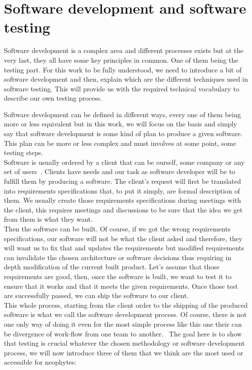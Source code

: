 \documentclass[12pt]{article}
\theoremstyle{definition}
\theoremstyle{definition}
\theoremstyle{remark}
\begin{document}
\clearpage
\part{Software development and software testing}

Software development is a complex area and different processes exists but at the very last, they all have some key principles in common. One of them being the testing part. For this work to be fully understood, we need to introduce a bit of software development and then, explain which are the different techniques used in software testing. This will provide us with the required technical vocabulary to describe our own testing process.

Software development can be defined in different ways, every one of them being more or less equivalent but in this work, we will focus on the basis and simply say that software development is some kind of plan to produce a given software. This plan can be more or less complex and must involves at some point, some testing steps.\\

Software is usually ordered by a client that can be ourself, some company or any set of users~\cite{SoftwareDevelopment:2016}. Clients have needs and our task as software developer will be to fulfill them by producing a software. The client's request will first be translated into requirements specifications that, to put it simply, are formal description of them. We usually create those requirements specifications during meetings with the client, this requires meetings and discussions to be sure that the idea we get from them is what they want.\\

Then the software can be built. Of course, if we got the wrong requirements specifications, our software will not be what the client asked and therefore, they will want us to fix that and updates the requirements but modified requirements can invalidate the chosen architecture or software decisions thus requiring in depth modification of the current built product. Let's assume that those requirements are good, then, once the software is built, we want to test it to ensure that it works and that it meets the given requirements. Once those test are successfully passed, we can ship the software to our client.\\

This whole process, starting from the client order to the shipping of the produced software is what we call the software development process. Of course, there is not one only way of doing it even for the most simple process like this one their can be divergence of work-flow from one team to another.~\cite{IIS2:IIS202348} The goal here is to show that testing is crucial whatever the chosen methodology or software development process, we will now introduce three of them that we think are the most used or accessible for neophytes:
\end{document}
